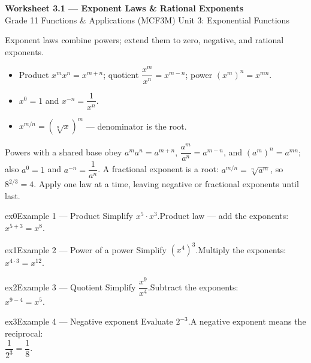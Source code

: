 \documentclass[11pt]{article}
\begin{document}
\begin{center}
{\LARGE\bfseries\color{titleblue}Worksheet 3.1 --- Exponent Laws \& Rational Exponents}\\[2pt]
{\small Grade 11 Functions \& Applications (MCF3M) \textperiodcentered{} Unit 3: Exponential Functions}
\end{center}

\begin{ideabox}
Exponent laws combine powers; extend them to zero, negative, and rational exponents.
\begin{itemize}[leftmargin=*,itemsep=2pt]
  \item Product $x^m x^n=x^{m+n}$; quotient $\dfrac{x^m}{x^n}=x^{m-n}$; power $(x^m)^n=x^{mn}$.
  \item $x^0=1$ and $x^{-n}=\dfrac{1}{x^n}$.
  \item $x^{m/n}=\left(\sqrt[n]{x}\right)^m$ — denominator is the root.
\end{itemize}
\end{ideabox}

\begin{learnbox}
Powers with a shared base obey $a^m a^n=a^{m+n}$, $\dfrac{a^m}{a^n}=a^{m-n}$, and $(a^m)^n=a^{mn}$; also $a^0=1$ and $a^{-n}=\dfrac{1}{a^n}$.
A fractional exponent is a root: $a^{m/n}=\sqrt[n]{a^m}$, so $8^{2/3}=4$.
Apply one law at a time, leaving negative or fractional exponents until last.
\end{learnbox}


\begin{example}{ex0}{Example 1 --- Product}
Simplify $x^5\cdot x^3$.\soln Product law — add the exponents: \\ $x^{5+3}=x^8$.
\end{example}

\begin{example}{ex1}{Example 2 --- Power of a power}
Simplify $(x^4)^3$.\soln Multiply the exponents: \\ $x^{4\cdot3}=x^{12}$.
\end{example}

\begin{example}{ex2}{Example 3 --- Quotient}
Simplify $\dfrac{x^9}{x^4}$.\soln Subtract the exponents: \\ $x^{9-4}=x^5$.
\end{example}

\begin{example}{ex3}{Example 4 --- Negative exponent}
Evaluate $2^{-3}$.\soln A negative exponent means the reciprocal: \\ $\dfrac{1}{2^3}=\dfrac18$.
\end{example}
\end{document}
